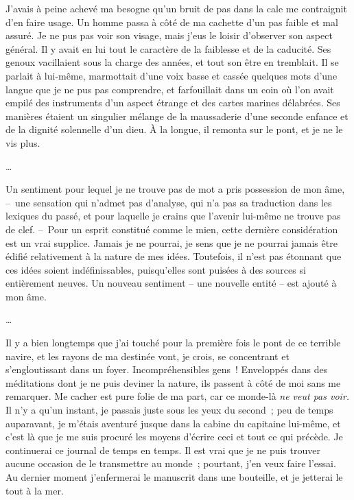 \documentclass[french,twoside]{book} %
\begin{document}
J’avais à peine achevé ma besogne qu’un bruit de pas dans la cale me contraignit d’en faire usage. Un homme passa à côté de ma cachette d’un pas faible et mal assuré. Je ne pus pas voir son visage, mais j’eus le loisir d’observer son aspect général. Il y avait en lui tout le caractère de la faiblesse et de la caducité. Ses genoux vacillaient sous la charge des années, et tout son être en tremblait. Il se parlait à lui-même, marmottait d’une voix basse et cassée quelques mots d’une langue que je ne pus pas comprendre, et farfouillait dans un coin où l’on avait empilé des instruments d’un aspect étrange et des cartes marines délabrées. Ses manières étaient un singulier mélange de la maussaderie d’une seconde enfance et de la dignité solennelle d’un dieu. À la longue, il remonta sur le pont, et je ne le vis plus.\par
…\par
\noindent Un sentiment pour lequel je ne trouve pas de mot a pris possession de mon âme, – une sensation qui n’admet pas d’analyse, qui n’a pas sa traduction dans les lexiques du passé, et pour laquelle je crains que l’avenir lui-même ne trouve pas de clef. – Pour un esprit constitué comme le mien, cette dernière considération est un vrai supplice. Jamais je ne pourrai, je sens que je ne pourrai jamais être édifié relativement à la nature de mes idées. Toutefois, il n’est pas étonnant que ces idées soient indéfinissables, puisqu’elles sont puisées à des sources si entièrement neuves. Un nouveau sentiment – une nouvelle entité – est ajouté à mon âme.\par
…\par
\noindent Il y a bien longtemps que j’ai touché pour la première fois le pont de ce terrible navire, et les rayons de ma destinée vont, je crois, se concentrant et s’engloutissant dans un foyer. Incompréhensibles gens ! Enveloppés dans des méditations dont je ne puis deviner la nature, ils passent à côté de moi sans me remarquer. Me cacher est pure folie de ma part, car ce monde-là \emph{ne veut pas voir.} Il n’y a qu’un instant, je passais juste sous les yeux du second ; peu de temps auparavant, je m’étais aventuré jusque dans la cabine du capitaine lui-même, et c’est là que je me suis procuré les moyens d’écrire ceci et tout ce qui précède. Je continuerai ce journal de temps en temps. Il est vrai que je ne puis trouver aucune occasion de le transmettre au monde ; pourtant, j’en veux faire l’essai. Au dernier moment j’enfermerai le manuscrit dans une bouteille, et je jetterai le tout à la mer.\par
\end{document}
